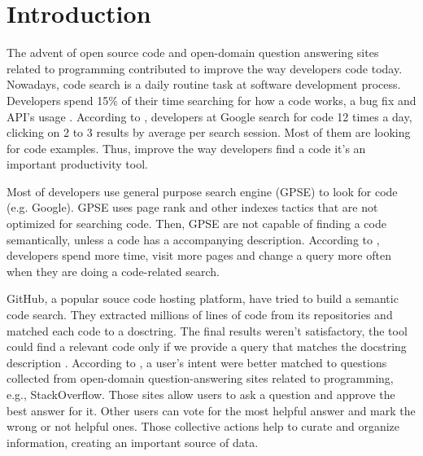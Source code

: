 \documentclass[sigconf]{acmart}
\begin{document}
\maketitle

\section{Introduction}

The advent of open source code and open-domain question answering sites related to programming contributed to improve the way developers code today. Nowadays, code search is a daily routine task at software development process. Developers spend 15\% of their time searching for how a code works, a bug fix and API's usage \cite{what-developers-search-for-on-the-web:xia:2017}. According to \cite{sadowski-how-developers-search-for-code-case-study:2015}, developers at Google search for code 12 times a day, clicking on 2 to 3 results by average per search session. Most of them are looking for code examples. Thus, improve the way developers find a code it's an important productivity tool.  

Most of developers use general purpose search engine (GPSE) to look for code (e.g. Google). GPSE uses page rank and other indexes tactics that are not optimized for searching code. Then, GPSE are not capable of finding a code semantically, unless a code has a accompanying description. According to \cite{masudur-developers-use-google-code-retrieval:2018}, developers spend more time, visit more pages and change a query more often when they are doing a code-related search.

GitHub, a popular souce code hosting platform, have tried to build a semantic code search. They extracted millions of lines of code from its repositories and matched each code to a dosctring. The final results weren't satisfactory, the tool could find a relevant code only if we provide a query that matches the docstring description \citep{husain-github-semantic-search-code-2019}. According to \cite{cambronero-deep-code-search-2019}, a user's intent were better matched to questions collected from open-domain question-answering sites related to programming, e.g., StackOverflow. Those sites allow users to ask a question and approve the best answer for it. Other users can vote for the most helpful answer and mark the wrong or not helpful ones. Those collective actions help to curate and organize information, creating an important source of data.
\end{document}
